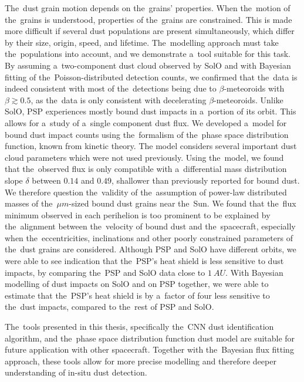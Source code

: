 The~dust grain motion depends on the~grains' properties. When the~motion of the~grains is understood, properties of the~grains are constrained. This is made more difficult if several dust populations are present simultaneously, which differ by their size, origin, speed, and lifetime. The~modelling approach must take the~populations into account, and we demonstrate a~tool suitable for this task. By assuming a~two-component dust cloud observed by SolO and with Bayesian fitting of the~Poisson-distributed detection counts, we confirmed that the~data is indeed consistent with most of the~detections being due to $\beta$-meteoroids with $\beta\gtrsim 0.5$, as the~data is only consistent with decelerating $\beta$-meteoroids. Unlike SolO, PSP experiences mostly bound dust impacts in a~portion of its orbit. This allows for a~study of a~single component dust flux. We developed a~model for bound dust impact counts using the~formalism of the~phase space distribution function, known from kinetic theory. The model considers several important dust cloud parameters which were not used previously. Using the~model, we found that the~observed flux is only compatible with a~differential mass distribution slope $\delta$ between $0.14$ and $0.49$, shallower than previously reported for bound dust. We therefore question the~validity of the~assumption of power-law distributed masses of the~$\si{\mu m}$-sized bound dust grains near the~Sun. We found that the~flux minimum observed in each perihelion is too prominent to be explained by the~alignment between the~velocity of bound dust and the~spacecraft, especially when the~eccentricities, inclinations and other poorly constrained parameters of the~dust grains are considered. Although PSP and SolO have different orbits, we were able to see indication that the~PSP's heat shield is less sensitive to dust impacts, by comparing the~PSP and SolO data close to $\SI{1}{AU}$. With Bayesian modelling of dust impacts on SolO and on PSP together, we were able to estimate that the~PSP's heat shield is by a~factor of four less sensitive to the~dust impacts, compared to the~rest of PSP and SolO.  

The~tools presented in this thesis, specifically the~CNN dust identification algorithm, and the~phase space distribution function dust model are suitable for future application with other spacecraft. Together with the~Bayesian flux fitting approach, these tools allow for more precise modelling and therefore deeper understanding of in-situ dust detection.  